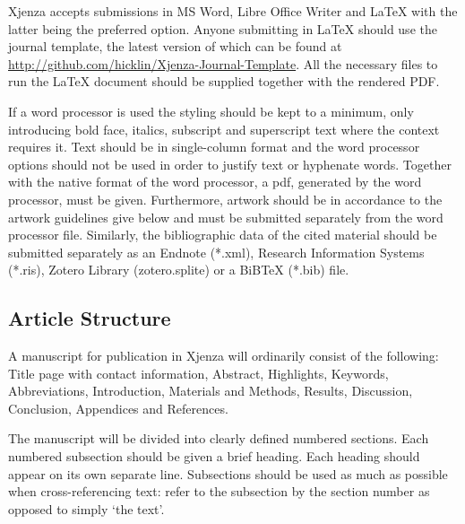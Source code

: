 Xjenza accepts submissions in MS Word, Libre Office Writer and \LaTeX{} with the latter being the preferred option. Anyone submitting in \LaTeX{} should use the journal template, the latest version of which can be found at \url{http://github.com/hicklin/Xjenza-Journal-Template}. All the necessary files to run the \LaTeX{} document should be supplied together with the rendered PDF.

If a word processor is used the styling should be kept to a minimum, only introducing bold face, italics, subscript and superscript text where the context requires it. Text should be in single-column format and the word processor options should not be used in order to justify text or hyphenate words. Together with the native format of the word processor, a pdf, generated by the word processor, must be given. Furthermore, artwork should be in accordance to the artwork guidelines give below and must be submitted separately from the word processor file. Similarly, the bibliographic data of the cited material should be submitted separately as an Endnote (*.xml), Research Information Systems (*.ris), Zotero Library (zotero.splite) or a BiB\TeX{} (*.bib) file.

\subsection*{Article Structure}

A manuscript for publication in Xjenza will ordinarily consist of the following: Title page with contact information, Abstract, Highlights, Keywords, Abbreviations, Introduction, Materials and Methods, Results, Discussion, Conclusion, Appendices and References.

The manuscript will be divided into clearly defined numbered sections. Each numbered subsection should be given a brief heading. Each heading should appear on its own separate line. Subsections should be used as much as possible when cross-referencing text: refer to the subsection by the section number as opposed to simply `the text'.

